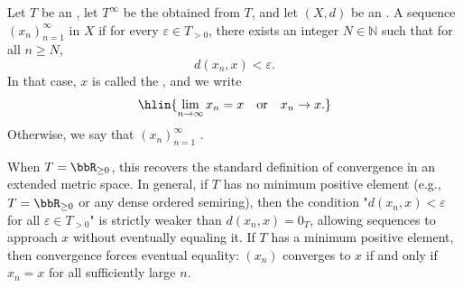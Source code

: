 \begin{definition} \label{definition:convergence_and_limit_of_sequence_in_extended_metric_space_valued_in_ordered_commutative_monoid_with_adjoined_infinity}
    Let $T$ be an , let $T^\infty$ be the  obtained from $T$, and let $(X, d)$ be an .
    A sequence $(x_n)_{n=1}^\infty$ in $X$  if for every $\varepsilon \in T_{>0}$, there exists an integer $N \in \mathbb{N}$ such that for all $n \geq N$,
    $$d(x_n, x) < \varepsilon.$$
    In that case, $x$ is called the , and we write
    $$\hlin{\lim_{n \to \infty} x_n = x \quad \text{or} \quad x_n \to x.}$$
    Otherwise, we say that $(x_n)_{n=1}^\infty$ .

    When $T = \bbR_{\geq 0}$, this recovers the standard definition of convergence in an extended metric space. In general, if $T$ has no minimum positive element (e.g., $T = \bbR_{\geq 0}$ or any dense ordered semiring), then the condition "$d(x_n,x) < \varepsilon$ for all $\varepsilon \in T_{>0}$" is strictly weaker than $d(x_n,x) = 0_T$, allowing sequences to approach $x$ without eventually equaling it. If $T$ has a minimum positive element, then convergence forces eventual equality: $(x_n)$ converges to $x$ if and only if $x_n = x$ for all sufficiently large $n$.

\end{definition}
